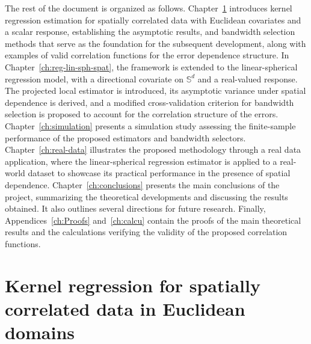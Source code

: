 \documentclass[12pt]{report} %
\newcommand{\Sd}{\mathbb{S}^{d}}
\begin{document}
The rest of the document is organized as follows. Chapter~\ref{ch:reg-lin-sph} introduces kernel regression estimation for spatially correlated data with Euclidean covariates and a scalar response, establishing the asymptotic results, and bandwidth selection methods that serve as the foundation for the subsequent development, along with examples of valid correlation functions for the error dependence structure. In Chapter~\ref{ch:reg-lin-sph-spat}, the framework is extended to the linear-spherical regression model, with a directional covariate on $\Sd$ and a real-valued response. The projected local estimator is introduced, its asymptotic variance under spatial dependence is derived, and a modified cross-validation criterion for bandwidth selection is proposed to account for the correlation structure of the errors. Chapter~\ref{ch:simulation} presents a simulation study assessing the finite-sample performance of the proposed estimators and bandwidth selectors. Chapter~\ref{ch:real-data} illustrates the proposed methodology through a real data application, where the linear-spherical regression estimator is applied to a real-world dataset to showcase its practical performance in the presence of spatial dependence. Chapter~\ref{ch:conclusions} presents the main conclusions of the project, summarizing the theoretical developments and discussing the results obtained. It also outlines several directions for future research. Finally, Appendices~\ref{ch:Proofs} and~\ref{ch:calcu} contain the proofs
of the main theoretical results and the calculations verifying the validity of the proposed correlation functions.


\chapter{Kernel regression for spatially correlated data in Euclidean domains} \label{ch:reg-lin-sph}



\end{document}
